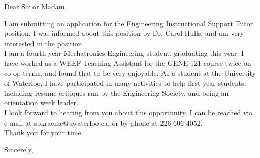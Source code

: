 \documentclass{letter}
\begin{document}
\begin{letter}{}
\opening{Dear Sir or Madam,}
I am submitting an application for the Engineering Instructional Support Tutor position. I was informed about this position by Dr. Carol Hulls, and am very interested in the position. \\

I am a fourth year Mechatronics Engineering student, graduating this year. I have worked as a WEEF Teaching Assistant for the GENE 121 course twice on co-op terms, and found that to be very enjoyable. As a student at the University of Waterloo, I have participated in many activities to help first year students, including resume critiques run by the Engineering Society, and being an orientation week leader. \\

I look forward to hearing from you about this opportunity. I can be reached via e-mail at sbkraeme@uwaterloo.ca, or by phone at 226-606-4052. \\

Thank you for your time.
\closing{Sincerely,}
\end{letter}
\end{document}
